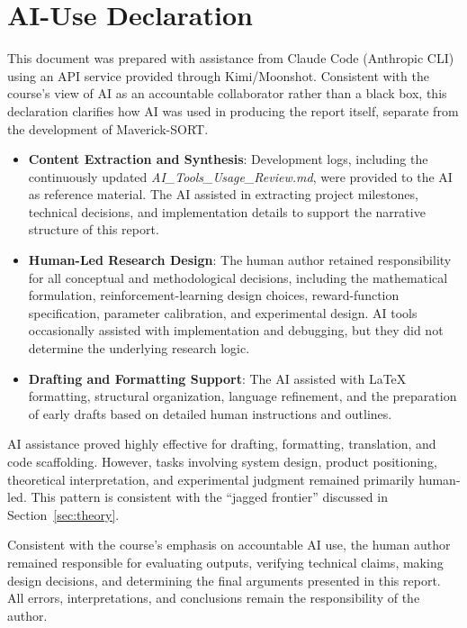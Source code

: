 \section{AI-Use Declaration}

This document was prepared with assistance from Claude Code (Anthropic CLI) using an API service provided through Kimi/Moonshot. Consistent with the course's view of AI as an accountable collaborator rather than a black box, this declaration clarifies how AI was used in producing the report itself, separate from the development of Maverick-SORT.

\begin{itemize}
\item \textbf{Content Extraction and Synthesis}: Development logs, including the continuously updated \textit{AI\_Tools\_Usage\_Review.md}, were provided to the AI as reference material. The AI assisted in extracting project milestones, technical decisions, and implementation details to support the narrative structure of this report.

\item \textbf{Human-Led Research Design}: The human author retained responsibility for all conceptual and methodological decisions, including the mathematical formulation, reinforcement-learning design choices, reward-function specification, parameter calibration, and experimental design. AI tools occasionally assisted with implementation and debugging, but they did not determine the underlying research logic.

\item \textbf{Drafting and Formatting Support}: The AI assisted with LaTeX formatting, structural organization, language refinement, and the preparation of early drafts based on detailed human instructions and outlines.

\end{itemize}

AI assistance proved highly effective for drafting, formatting, translation, and code scaffolding. However, tasks involving system design, product positioning, theoretical interpretation, and experimental judgment remained primarily human-led. This pattern is consistent with the ``jagged frontier'' discussed in Section~\ref{sec:theory}.

Consistent with the course's emphasis on accountable AI use, the human author remained responsible for evaluating outputs, verifying technical claims, making design decisions, and determining the final arguments presented in this report. All errors, interpretations, and conclusions remain the responsibility of the author.
